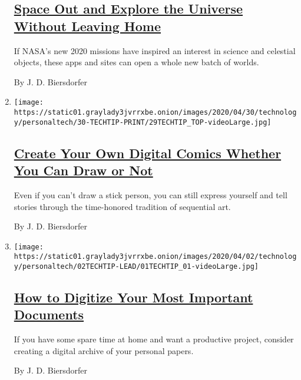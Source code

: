 \begin{enumerate}
{  \subsection{\texorpdfstring{\href{/2020/05/27/technology/personaltech/techtip-nasa-apps.html}{Space
  Out and Explore the Universe Without Leaving
  Home}}{Space Out and Explore the Universe Without Leaving Home}}\label{space-out-and-explore-the-universe-without-leaving-home}}

  If NASA's new 2020 missions have inspired an interest in science and
  celestial objects, these apps and sites can open a whole new batch of
  worlds.

  By J. D. Biersdorfer
\item
  \texttt{[image: https://static01.graylady3jvrrxbe.onion/images/2020/04/30/technology/personaltech/30-TECHTIP-PRINT/29TECHTIP\_TOP-videoLarge.jpg]}

  \hypertarget{create-your-own-digital-comics-whether-you-can-draw-or-not}{%
  \subsection{\texorpdfstring{\href{/2020/04/29/technology/personaltech/create-your-own-digital-comics-whether-you-can-draw-or-not.html}{Create
  Your Own Digital Comics Whether You Can Draw or
  Not}}{Create Your Own Digital Comics Whether You Can Draw or Not}}\label{create-your-own-digital-comics-whether-you-can-draw-or-not}}

  Even if you can't draw a stick person, you can still express yourself
  and tell stories through the time-honored tradition of sequential art.

  By J. D. Biersdorfer
\item
  \texttt{[image: https://static01.graylady3jvrrxbe.onion/images/2020/04/02/technology/personaltech/02TECHTIP-LEAD/01TECHTIP\_01-videoLarge.jpg]}

  \hypertarget{how-to-digitize-your-most-important-documents}{%
  \subsection{\texorpdfstring{\href{/2020/04/01/technology/personaltech/digitizing-important-documents.html}{How
  to Digitize Your Most Important
  Documents}}{How to Digitize Your Most Important Documents}}\label{how-to-digitize-your-most-important-documents}}

  If you have some spare time at home and want a productive project,
  consider creating a digital archive of your personal papers.

  By J. D. Biersdorfer
\end{enumerate}

